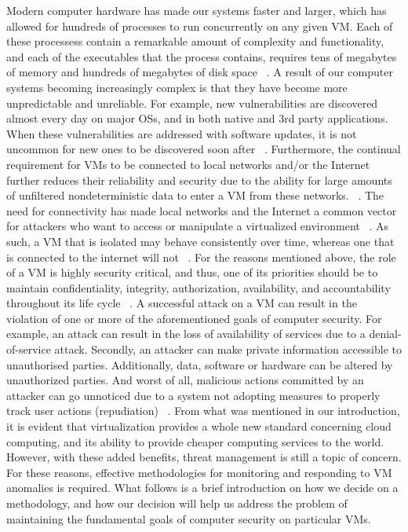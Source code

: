 \documentclass{report}
\begin{document}
\begin{spacing}{1.5}
{\large 
Modern computer hardware has made our systems faster and larger, which has allowed for hundreds of processes to run concurrently on any given VM. Each of these processess contain a remarkable amount of complexity and functionality, and each of the executables that the process contains, requires tens of megabytes of memory and hundreds of megabytes of disk space ~\cite{somayaji2002operating}. A result of our computer systems becoming increasingly complex is that they have become more unpredictable and unreliable. For example, new vulnerabilities are discovered almost every day on major OSs, and in both native and 3rd party applications. When these vulnerabilities are addressed with software updates, it is not uncommon for new ones to be discovered soon after ~\cite{somayaji2002operating}. Furthermore, the continual requirement for VMs to be connected to local networks and/or the Internet further reduces their reliability and security due to the ability for large amounts of unfiltered nondeterministic data to enter a VM from these networks. ~\cite{somayaji2002operating}. The need for connectivity has made local networks and the Internet a common vector for attackers who want to access or manipulate a virtualized environment ~\cite{win2014virtual}. As such, a VM that is isolated may behave consistently over time, whereas one that is connected to the internet will not ~\cite{somayaji2002operating}. For the reasons mentioned above, the role of a VM is highly security critical, and thus, one of its priorities should be to maintain confidentiality, integrity, authorization, availability, and accountability throughout its life cycle ~\cite{van2021computer}. A successful attack on a VM can result in the violation of one or more of the aforementioned goals of computer security. For example, an attack can result in the loss of availability of services due to a denial-of-service attack. Secondly, an attacker can make private information accessible to unauthorised parties. Additionally, data, software or hardware can be altered by unauthorized parties. And worst of all, malicious actions committed by an attacker can go unnoticed due to a system not adopting measures to properly track user actions (repudiation) ~\cite{van2021computer}. From what was mentioned in our introduction, it is evident that virtualization provides a whole new standard concerning cloud computing, and its ability to provide cheaper computing services to the world. However, with these added benefits, threat management is still a topic of concern. For these reasons, effective methodologies for monitoring and responding to VM anomalies is required. What follows is a brief introduction on how we decide on a methodology, and how our decision will help us address the problem of maintaining the fundamental goals of computer security on particular VMs.
\newline
}





\end{spacing}
\end{document}
